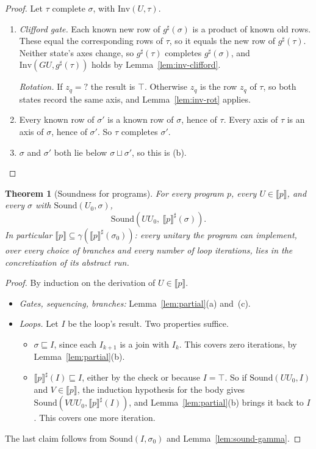 \documentclass[11pt]{article}
\newtheorem{theorem}{Theorem}[section]
\theoremstyle{definition}
\theoremstyle{remark}
\newcommand{\sem}[1]{\llbracket #1 \rrbracket}
\newcommand{\abs}[1]{\llbracket #1 \rrbracket^{\sharp}}
\newcommand{\gam}{\gamma}
\begin{document}
\begin{proof}
Let $\tau$ complete $\sigma$, with $\mathrm{Inv}(U, \tau)$.
\begin{enumerate}[label=(\alph*), nosep]
  \item \emph{Clifford gate.} Each known new row of $g^\sharp(\sigma)$ is a product of
  known old rows. These equal the corresponding rows of $\tau$, so it equals the new row of
  $g^\sharp(\tau)$. Neither state's axes change, so $g^\sharp(\tau)$ completes
  $g^\sharp(\sigma)$, and $\mathrm{Inv}(GU, g^\sharp(\tau))$ holds by
  Lemma~\ref{lem:inv-clifford}.

  \emph{Rotation.} If $z_q = ?$ the result is $\top$. Otherwise $z_q$ is the row $z_q$ of
  $\tau$, so both states record the same axis, and Lemma~\ref{lem:inv-rot} applies.
  \item Every known row of $\sigma'$ is a known row of $\sigma$, hence of $\tau$. Every axis
  of $\tau$ is an axis of $\sigma$, hence of $\sigma'$. So $\tau$ completes $\sigma'$.
  \item $\sigma$ and $\sigma'$ both lie below $\sigma \sqcup \sigma'$, so this is (b).
  \qedhere
\end{enumerate}
\end{proof}

\begin{theorem}[Soundness for programs]\label{thm:programs}
For every program $p$, every $U \in \sem{p}$, and every $\sigma$ with
$\mathrm{Sound}(U_0, \sigma)$,
\[
  \mathrm{Sound}(U U_0,\ \abs{p}(\sigma)).
\]
In particular $\sem{p} \subseteq \gam(\abs{p}(\sigma_0))$: every unitary the program can
implement, over every choice of branches and every number of loop iterations, lies in the
concretization of its abstract run.
\end{theorem}

\begin{proof}
By induction on the derivation of $U \in \sem{p}$.
\begin{itemize}[nosep]
  \item \emph{Gates, sequencing, branches:} Lemma~\ref{lem:partial}(a) and~(c).
  \item \emph{Loops.} Let $I$ be the loop's result. Two properties suffice.
  \begin{itemize}[nosep]
    \item $\sigma \sqsubseteq I$, since each $I_{k+1}$ is a join with $I_k$. This covers zero
    iterations, by Lemma~\ref{lem:partial}(b).
    \item $\abs{p}(I) \sqsubseteq I$, either by the check or because $I = \top$. So if
    $\mathrm{Sound}(UU_0, I)$ and $V \in \sem{p}$, the induction hypothesis for the body
    gives $\mathrm{Sound}(VUU_0, \abs{p}(I))$, and Lemma~\ref{lem:partial}(b) brings it
    back to $I$. This covers one more iteration.
  \end{itemize}
\end{itemize}
The last claim follows from $\mathrm{Sound}(I, \sigma_0)$ and
Lemma~\ref{lem:sound-gamma}.
\end{proof}
\end{document}
